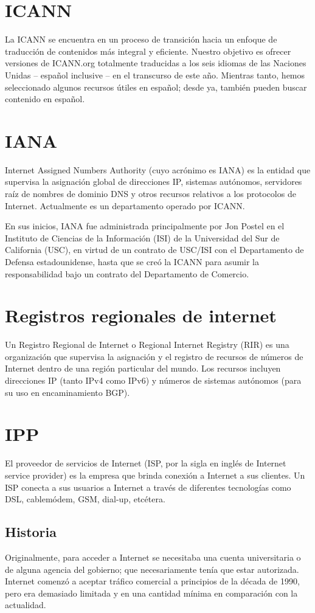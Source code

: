\documentclass[11pt,letterpaper]{article}
\theoremstyle{definition}
\begin{document}
	\section {ICANN}
		La ICANN se encuentra en un proceso de transición hacia un enfoque de traducción de contenidos más integral y eficiente. Nuestro objetivo es ofrecer versiones de ICANN.org totalmente traducidas a los seis idiomas de las Naciones Unidas -- español inclusive -- en el transcurso de este año. Mientras tanto, hemos seleccionado algunos recursos útiles en español; desde ya, también pueden buscar contenido en español. 

	\section {IANA}
		Internet Assigned Numbers Authority (cuyo acrónimo es IANA) es la entidad que supervisa la asignación global de direcciones IP, sistemas autónomos, servidores raíz de nombres de dominio DNS y otros recursos relativos a los protocolos de Internet. Actualmente es un departamento operado por ICANN.

		En sus inicios, IANA fue administrada principalmente por Jon Postel en el Instituto de Ciencias de la Información (ISI) de la Universidad del Sur de California (USC), en virtud de un contrato de USC/ISI con el Departamento de Defensa estadounidense, hasta que se creó la ICANN para asumir la responsabilidad bajo un contrato del Departamento de Comercio.

	\section {Registros regionales de internet}
		Un Registro Regional de Internet o Regional Internet Registry (RIR) es una organización que supervisa la asignación y el registro de recursos de números de Internet dentro de una región particular del mundo. Los recursos incluyen direcciones IP (tanto IPv4 como IPv6) y números de sistemas autónomos (para su uso en encaminamiento BGP).

	\section {IPP}	
		El proveedor de servicios de Internet (ISP, por la sigla en inglés de Internet service provider) es la empresa que brinda conexión a Internet a sus clientes. Un ISP conecta a sus usuarios a Internet a través de diferentes tecnologías como DSL, cablemódem, GSM, dial-up, etcétera.

		\subsection {Historia} 
			Originalmente, para acceder a Internet se necesitaba una cuenta universitaria o de alguna agencia del gobierno; que necesariamente tenía que estar autorizada. Internet comenzó a aceptar tráfico comercial a principios de la década de 1990, pero era demasiado limitada y en una cantidad mínima en comparación con la actualidad. 	
\end{document}

